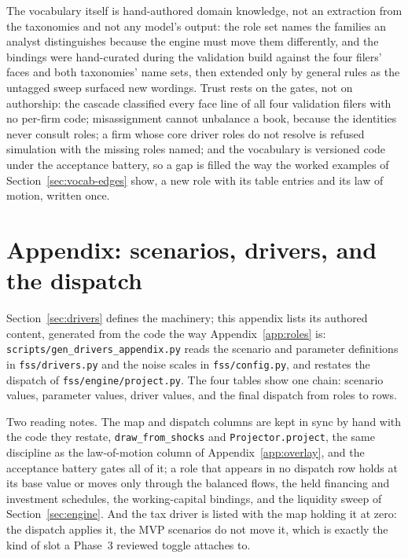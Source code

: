 \documentclass[11pt]{article}
\begin{document}
The vocabulary itself is hand-authored domain knowledge, not an extraction from the taxonomies and not any model's output: the role set names the families an analyst distinguishes because the engine must move them differently, and the bindings were hand-curated during the validation build against the four filers' faces and both taxonomies' name sets, then extended only by general rules as the untagged sweep surfaced new wordings. Trust rests on the gates, not on authorship: the cascade classified every face line of all four validation filers with no per-firm code; misassignment cannot unbalance a book, because the identities never consult roles; a firm whose core driver roles do not resolve is refused simulation with the missing roles named; and the vocabulary is versioned code under the acceptance battery, so a gap is filled the way the worked examples of Section~\ref{sec:vocab-edges} show, a new role with its table entries and its law of motion, written once.



\clearpage
\section{Appendix: scenarios, drivers, and the dispatch}
\label{app:drivers}
Section~\ref{sec:drivers} defines the machinery; this appendix lists its authored content, generated from the code the way Appendix~\ref{app:roles} is: \texttt{scripts/\allowbreak gen\_drivers\_appendix.py} reads the scenario and parameter definitions in \texttt{fss/drivers.py} and the noise scales in \texttt{fss/config.py}, and restates the dispatch of \texttt{fss/engine/project.py}. The four tables show one chain: scenario values, parameter values, driver values, and the final dispatch from roles to rows.

Two reading notes. The map and dispatch columns are kept in sync by hand with the code they restate, \texttt{draw\_from\_shocks} and \texttt{Projector.project}, the same discipline as the law-of-motion column of Appendix~\ref{app:overlay}, and the acceptance battery gates all of it; a role that appears in no dispatch row holds at its base value or moves only through the balanced flows, the held financing and investment schedules, the working-capital bindings, and the liquidity sweep of Section~\ref{sec:engine}. And the tax driver is listed with the map holding it at zero: the dispatch applies it, the MVP scenarios do not move it, which is exactly the kind of slot a Phase~3 reviewed toggle attaches to.
\end{document}
